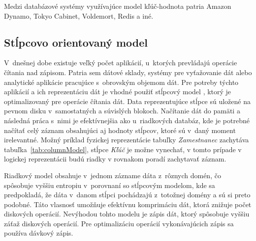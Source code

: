 \documentclass[11pt,twoside,a4paper]{book}
\begin{document}
Medzi databázové systémy využívajúce model kľúč-hodnota patria Amazon Dynamo, Tokyo Cabinet, Voldemort, Redis a iné.

\subsection{Stĺpcovo orientovaný model}


V~dnešnej dobe existuje veľký počet aplikácií, u~ktorých prevládajú operácie čítania nad zápisom. Patria sem dátové sklady, systémy pre vyťažovanie dát alebo analytické aplikácie pracujúce s~obrovským objemom dát. Pre potreby týchto aplikácií a ich reprezentáciu dát je vhodné použiť stĺpcový model \cite{abadi2009column, abadi2009}, ktorý je optimalizovaný pre operácie čítania dát. Data reprezentujúce stĺpce sú uložené na pevnom disku v~samostatných a súvislých blokoch. Načítanie dát do pamäti a následná práca s~nimi je efektívnejšia ako u~riadkových databáz, kde je potrebné načítať celý záznam obsahujúci aj hodnoty stĺpcov, ktoré sú v~daný moment irelevantné. Možný príklad fyzickej reprezentácie tabuľky \emph{Zamestnanec} zachytáva tabuľka~\ref{tab:columnModel}, stĺpce \emph{Kľúč} je možne vynechať, v tomto prípade v logickej reprezentácii budú riadky v rovnakom poradí zachytavať záznam.

Riadkový model obsahuje v~jednom zázname dáta z~rôznych domén, čo spôsobuje vyššiu entropiu v~porovnaní so stĺpcovým modelom, kde sa predpokladá, že dáta v~danom stĺpci pochádzajú z~totožnej domény a sú si preto podobné. Táto vlasnosť umožňuje efektívnu komprimáciu dát, ktorá znižuje počet diskových operácií. Nevýhodou tohto modelu je zápis dát, ktorý spôsobuje vyššiu záťaž diskových operácií. Pre optimalizáciu operácií vykonávajúcich zápis sa používa dávkový zápis.

\end{document}
